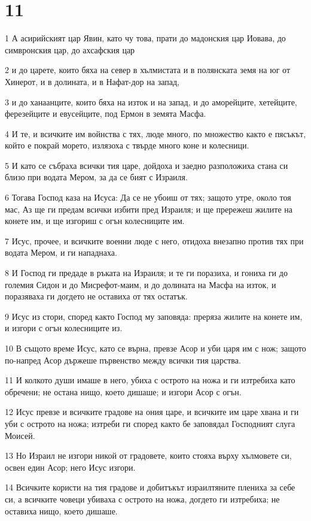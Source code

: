 \chapter{11}

\par 1 А асирийският цар Явин, като чу това, прати до мадонския цар Иовава, до симвронския цар, до ахсафския цар
\par 2 и до царете, които бяха на север в хълмистата и в полянската земя на юг от Хинерот, и в долината, и в Нафат-дор на запад,
\par 3 и до ханаанците, които бяха на изток и на запад, и до аморейците, хетейците, ферезейците и евусейците, под Ермон в земята Масфа.
\par 4 И те, и всичките им войнства с тях, люде много, по множество както е пясъкът, който е покрай морето, излязоха с твърде много коне и колесници.
\par 5 И като се събраха всички тия царе, дойдоха и заедно разположиха стана си близо при водата Мером, за да се бият с Израиля.
\par 6 Тогава Господ каза на Исуса: Да се не убоиш от тях; защото утре, около тоя мас, Аз ще ги предам всички избити пред Израиля; и ще прережеш жилите на конете им, и ще изгориш с огън колесниците им.
\par 7 Исус, прочее, и всичките военни люде с него, отидоха внезапно против тях при водата Мером, и ги нападнаха.
\par 8 И Господ ги предаде в ръката на Израиля; и те ги поразиха, и гониха ги до големия Сидон и до Мисрефот-маим, и до долината на Масфа на изток, и поразяваха ги догдето не оставиха от тях остатък.
\par 9 Исус из стори, според както Господ му заповяда: преряза жилите на конете им, и изгори с огън колесниците из.
\par 10 В същото време Исус, като се върна, превзе Асор и уби царя им с нож; защото по-напред Асор държеше първенство между всички тия царства.
\par 11 И колкото души имаше в него, убиха с острото на ножа и ги изтребиха като обречени; не остана нищо, което дишаше; и изгори Асор с огън.
\par 12 Исус превзе и всичките градове на ония царе, и всичките им царе хвана и ги уби с острото на ножа; изтреби ги според както бе заповядал Господният слуга Моисей.
\par 13 Но Израил не изгори никой от градовете, които стояха върху хълмовете си, освен един Асор; него Исус изгори.
\par 14 Всичките користи на тия градове и добитъкът израилтяните плениха за себе си, а всичките човеци убиваха с острото на ножа, догдето ги изтребиха; не оставиха нищо, което дишаше.
